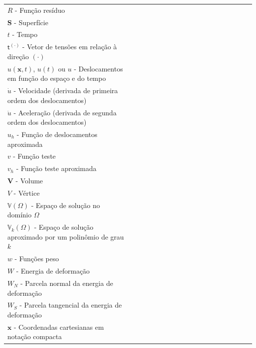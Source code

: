 \begin{listasimb}
\begin{longtable}[l]{p{0.5\linewidth}p{15.0\linewidth}}
$R$ - Função resíduo \\
$\mathbf{S}$ - Superfície \\
$t$ - Tempo \\
$\mathsf{t}^{(\cdot)}$ - Vetor de tensões em relação à direção $(\cdot)$ \\
$u(\mathbf{x},t)$, $u(t)$ ou $u$ - Deslocamentos em função do espaço e do tempo \\
$\dot{u}$ - Velocidade (derivada de primeira ordem dos deslocamentos) \\
$\ddot{u}$ - Aceleração (derivada de segunda ordem dos deslocamentos) \\
$u_h$ - Função de deslocamentos aproximada \\
$v$ - Função teste \\
$v_h$ - Função teste aproximada \\
$\mathbf{V}$ - Volume \\
$V$ - Vértice \\
$\mathbb{V}(\Omega)$ - Espaço de solução no domínio $\Omega$ \\
$\mathbb{V}_k(\Omega)$ - Espaço de solução aproximado por um polinômio de grau $k$ \\
$w$ - Funções peso \\
$W$ - Energia de deformação \\
$W_N$ - Parcela normal da energia de deformação \\
$W_S$ - Parcela tangencial da energia de deformação \\
$\mathbf{x}$ - Coordenadas cartesianas em notação compacta \\


\end{longtable}
\end{listasimb}
